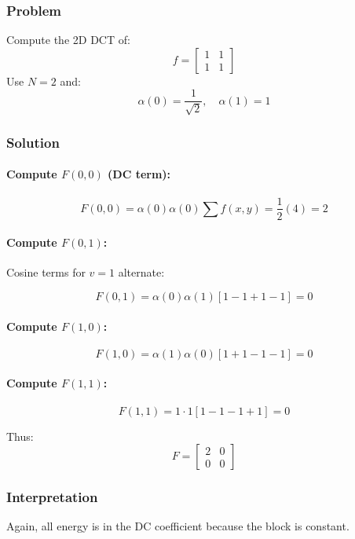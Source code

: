 \documentclass{AnantDocumentation}
\begin{document}
\subsubsection*{Problem}

Compute the 2D DCT of:
\[
f =
\begin{bmatrix}
1 & 1\\
1 & 1
\end{bmatrix}
\]
Use $N=2$ and:
\[
\alpha(0)=\frac{1}{\sqrt{2}},\quad \alpha(1)=1
\]

\subsubsection*{Solution}

\paragraph{Compute $F(0,0)$ (DC term):}

\[
F(0,0) = \alpha(0)\alpha(0)
\sum f(x,y)
= \frac{1}{2}(4) = 2
\]

\paragraph{Compute $F(0,1)$:}

Cosine terms for $v=1$ alternate:

\[
F(0,1)=\alpha(0)\alpha(1)[1 - 1 + 1 - 1] = 0
\]

\paragraph{Compute $F(1,0)$:}

\[
F(1,0)=\alpha(1)\alpha(0)[1+1-1-1] = 0
\]

\paragraph{Compute $F(1,1)$:}

\[
F(1,1)=1\cdot 1 [1 - 1 -1 + 1] = 0
\]

Thus:
\[
F =
\begin{bmatrix}
2 & 0\\
0 & 0
\end{bmatrix}
\]

\subsubsection*{Interpretation}

Again, all energy is in the DC coefficient because the block is constant.
\end{document}

